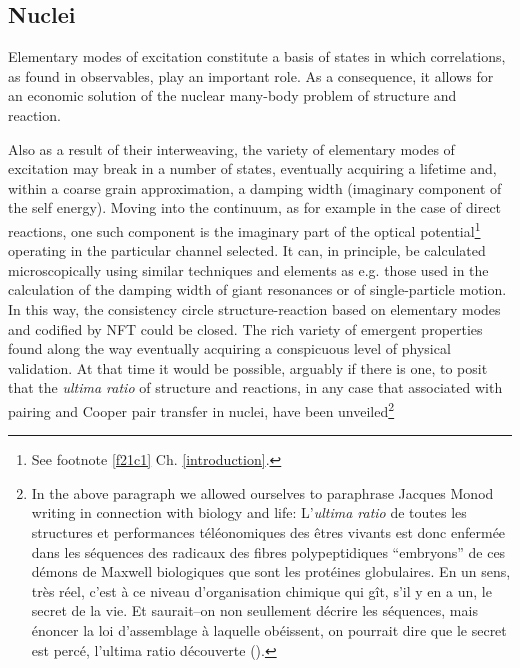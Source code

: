 \subsection{Nuclei}\label{S4.A.1}
Elementary modes of excitation constitute a basis of states in which correlations, as found in observables, play an important role. As a consequence, it allows for an economic solution of the nuclear many-body problem of structure and reaction.


Also as a result of their interweaving,  the variety of elementary modes of excitation may break in a number of states, eventually acquiring a lifetime and, within a coarse grain approximation, a damping width (imaginary component of the self energy). Moving into the continuum, as for example in the case of direct reactions, one such component is the imaginary part of the optical potential\footnote{See footnote \ref{f21c1} Ch. \ref{introduction}.} operating in the particular channel selected. It can, in principle, be calculated microscopically using similar techniques and elements as e.g. those used in the calculation of the damping width of giant resonances or of single-particle motion. In this way, the consistency circle structure-reaction based on elementary modes and codified by NFT could be closed. The rich variety of emergent properties found along the way eventually acquiring a conspicuous level of physical validation. At that time it would be possible, arguably if there is one, to posit that the \textit{ultima ratio} of structure and reactions, in any case that associated with pairing and Cooper pair transfer in nuclei, have been unveiled\footnote{In the above paragraph we allowed ourselves to paraphrase Jacques Monod writing in connection with biology and life: L'\textit{ultima ratio} de toutes les structures et performances t\'el\'eonomiques des \^etres vivants est donc enferm\'ee dans les s\'equences des radicaux des fibres polypeptidiques ``embryons'' de ces d\'emons de Maxwell biologiques que sont les prot\'eines globulaires. En un sens, tr\`{e}s r\'{e}el, c'est \`a ce niveau d'organisation chimique qui g\^it, s'il y en a un, le secret de la vie. Et saurait--on non seullement d\'ecrire les s\'equences, mais \'enoncer la loi d'assemblage \`a laquelle ob\'eissent, on pourrait dire que le secret est perc\'e, l'ultima ratio d\'ecouverte (\cite{Monod:70}).}
